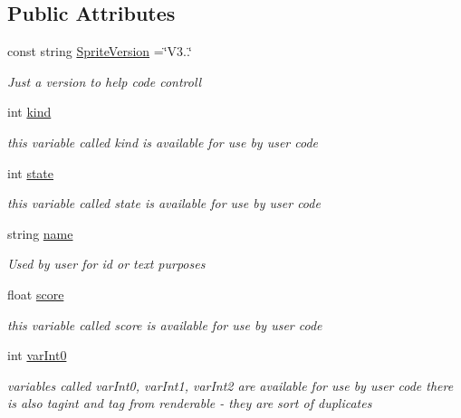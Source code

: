 \subsection*{Public Attributes}
\begin{DoxyCompactItemize}
\item 
const string \mbox{\hyperlink{class_r_c___framework_1_1_sprite3_af4a00055db200e357c65f9b289989ba5}{Sprite\+Version}} =\char`\"{}V3..\char`\"{}
\begin{DoxyCompactList}\small\item\em Just a version to help code controll \end{DoxyCompactList}\item 
int \mbox{\hyperlink{class_r_c___framework_1_1_sprite3_a569b5506e5da155612f938e414d40c0b}{kind}}
\begin{DoxyCompactList}\small\item\em this variable called kind is available for use by user code \end{DoxyCompactList}\item 
int \mbox{\hyperlink{class_r_c___framework_1_1_sprite3_a390f0fa7f5de0cb734e313b31551b9c3}{state}}
\begin{DoxyCompactList}\small\item\em this variable called state is available for use by user code \end{DoxyCompactList}\item 
string \mbox{\hyperlink{class_r_c___framework_1_1_sprite3_a0b0ba2dfebf13a8ecf6ef372e3048f3c}{name}}
\begin{DoxyCompactList}\small\item\em Used by user for id or text purposes \end{DoxyCompactList}\item 
float \mbox{\hyperlink{class_r_c___framework_1_1_sprite3_a4428b9c3efc3f675f04df8141dc6e108}{score}}
\begin{DoxyCompactList}\small\item\em this variable called score is available for use by user code \end{DoxyCompactList}\item 
int \mbox{\hyperlink{class_r_c___framework_1_1_sprite3_af2d07d57951fed3fd45129d58590974a}{var\+Int0}}
\begin{DoxyCompactList}\small\item\em variables called var\+Int0, var\+Int1, var\+Int2 are available for use by user code there is also tagint and tag from renderable -\/ they are sort of duplicates \end{DoxyCompactList}\item 

\end{DoxyCompactItemize}
